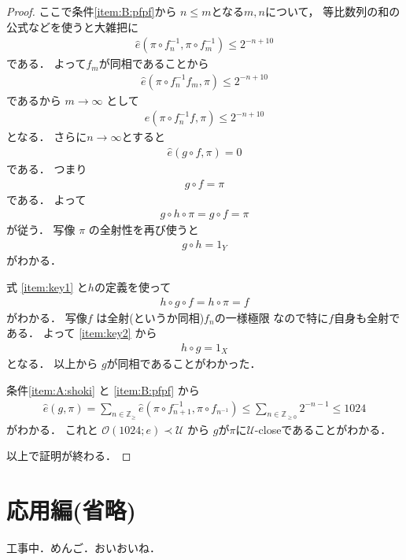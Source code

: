 \documentclass[leqno, a4paper, 12pt]{jsarticle}
\numberwithin{equation}{section}
\newcommand{\zz}{\mathbb{Z}}
\newcommand{\yocovfont}[1]{\mathscr{#1}}
\newcommand{\yofine}{\prec}
\newcommand{\yosupmet}[1]{\hat{#1}}
\newcommand{\yoballfam}[2]{\yocovfont{O}(#1; #2)}
\begin{document}
\begin{proof}
ここで条件\ref{item:B:pfpf}から
$n\le m$となる$m, n$について，
等比数列の和の公式などを使うと大雑把に
\begin{align}
\yosupmet{e}(\pi\circ f_{n}^{-1}, \pi\circ f_{m}^{-1})\le 2^{-n+10}
\end{align}
である．
よって$f_{m}$が同相であることから
\begin{align}
\yosupmet{e}(\pi\circ f_{n}^{-1}f_{m}, \pi)\le 2^{-n+10}
\end{align}
であるから
$m\to \infty$
として
\begin{align}
\yosupmet{e}(\pi\circ f_{n}^{-1}f, \pi)\le 2^{-n+10}
\end{align}
となる．
さらに$n\to \infty$とすると
\begin{align}
\yosupmet{e}(g\circ f, \pi)=0
\end{align}
である．
つまり
\begin{align}
g\circ f =\pi
\end{align}
である．
よって
\begin{align}
g\circ h\circ \pi=g\circ f=\pi
\end{align}
が従う．
写像
$\pi$
の全射性を再び使うと
\begin{align}\label{item:key1}
g\circ h=1_{Y}
\end{align}
がわかる．

式
\eqref{item:key1}
と$h$の定義を使って
\begin{align}\label{item:key2}
h\circ g\circ f= h\circ \pi =f
\end{align}
がわかる．
写像$f$
は全射(というか同相)$f_{n}$の一様極限
なので特に$f$自身も全射である．
よって
\eqref{item:key2}
から
\begin{align}\label{item:key2}
h\circ g=1_{X}
\end{align}
となる．
以上から
$g$が同相であることがわかった．


条件\ref{item:A:shoki}
と
\ref{item:B:pfpf}
から
\begin{align}
\yosupmet{e}(g, \pi)=\sum_{n\in \zz_{\ge}}
\yosupmet{e}(\pi\circ f_{n+1}^{-1}, \pi\circ f_{n^{-1}})
\le\sum_{n\in \zz_{\ge 0}}2^{-n-1}\le 1024
\end{align}
がわかる．
これと
$\yoballfam{1024}{e}\yofine \yocovfont{U}$
から
$g$が$\pi$に$\yocovfont{U}$-closeであることがわかる．

以上で証明が終わる．
\end{proof}




\section{応用編(省略)}
工事中．めんご．おいおいね．
\end{document}
